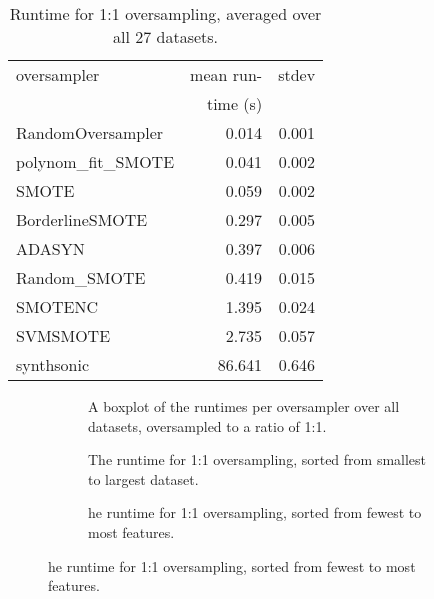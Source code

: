 \begin{table}[h]
    \centering
    \begin{tabular}{lrr}
    \toprule
    oversampler & mean run-  &  stdev \\
     & time (s) & \\
    \midrule
    RandomOversampler &    0.014 &        0.001 \\
    polynom\_fit\_SMOTE &    0.041 &        0.002 \\
    SMOTE             &    0.059 &        0.002 \\
    BorderlineSMOTE   &    0.297 &        0.005 \\
    ADASYN            &    0.397 &        0.006 \\
    Random\_SMOTE      &    0.419 &        0.015 \\
    SMOTENC           &    1.395 &        0.024 \\
    SVMSMOTE          &    2.735 &        0.057 \\
    synthsonic        &   86.641 &        0.646 \\
    \bottomrule
    \end{tabular}
    \caption{Runtime for 1:1 oversampling, averaged over all 27 datasets.}
    \label{tab:runtimes}
\end{table}

\begin{figure}[h!]
\centering
\begin{subfigure}[b]{0.7\textwidth}
    \centering
    
    \caption{A boxplot of the runtimes per oversampler over all datasets, oversampled to a ratio of 1:1.}
    \label{fig:boxplot}
\end{subfigure}
\vfill
\begin{subfigure}[b]{0.7\textwidth}
    \centering
    
    \caption{The runtime for 1:1 oversampling, sorted from smallest to largest dataset.}
    \label{fig:runvfeat}
\end{subfigure}
\vfill
\begin{subfigure}[b]{0.7\textwidth}
    \centering
    
    \caption{he runtime for 1:1 oversampling, sorted from fewest to most features.}
    \label{fig:runvsize}
\end{subfigure}

\end{figure}